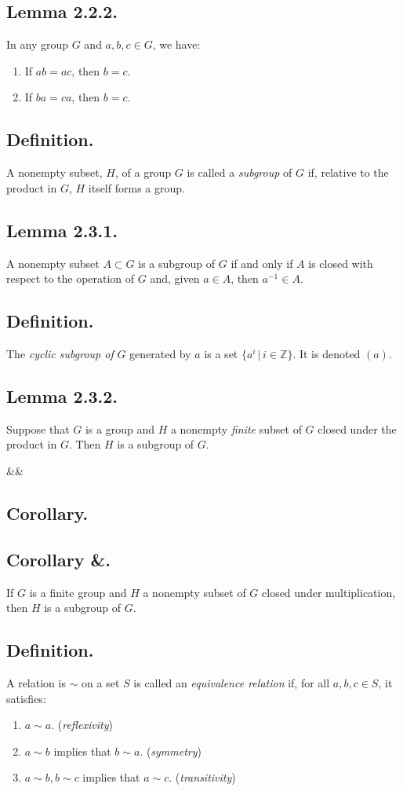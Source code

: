\documentclass{article}
\newenvironment{lemma}[1]{\subsection*{Lemma #1.}}{}
\newenvironment{defn}{\subsection*{Definition.}}{}
\newenvironment{corollary}[1]{
    \def\temp{#1}\def\null{&}\ifx\temp\null
        \subsection*{Corollary.}
    \else
        \subsection*{Corollary #1.}
    \fi
    
}{}
\newcommand*{\Z}{\mathbb{Z}}
\begin{document}
\begin{lemma}{2.2.2}
    In any group $G$ and $a, b, c \in G$, we have:
    \begin{enumerate}[label=(\alph*)]
        \item If $ab = ac$, then $b = c$.
        \item If $ba = ca$, then $b = c$.
    \end{enumerate}
\end{lemma}

\begin{defn}
    A nonempty subset, $H$, of a group $G$ is called a \textit{subgroup} of $G$ if,
    relative to the product in $G$, $H$ itself forms a group.
\end{defn}

\begin{lemma}{2.3.1}
    A nonempty subset $A \subset G$ is a subgroup of $G$ if and only if $A$ is closed 
    with respect to the operation of $G$ and, given $a \in A$, then $a^{-1} \in A$.
\end{lemma}

\begin{defn}
    The \textit{cyclic subgroup of} $G$ generated by $a$ is a set $\{a^i \, | \, i \in \Z\}$.
    It is denoted $(a)$.
\end{defn}

\begin{lemma}{2.3.2}
    Suppose that $G$ is a group and $H$ a nonempty \textit{finite} subset of $G$ closed under the product in $G$.
    Then $H$ is a subgroup of $G$.
\end{lemma}

\begin{corollary}{&}
    If $G$ is a finite group and $H$ a nonempty subset of $G$ closed under multiplication, then $H$ is a subgroup of $G$.
\end{corollary}

\begin{defn}
    A relation is $\sim$ on a set $S$ is called an \textit{equivalence relation} if,
    for all $a, b, c \in S$, it satisfies:
    \begin{enumerate}[label=(\alph*)]
        \item $a \sim a$. (\textit{reflexivity})
        \item $a \sim b$ implies that $b \sim a$. (\textit{symmetry})
        \item $a \sim b, b \sim c$ implies that $a \sim c$. (\textit{transitivity})
    \end{enumerate}
\end{defn}
\end{document}

